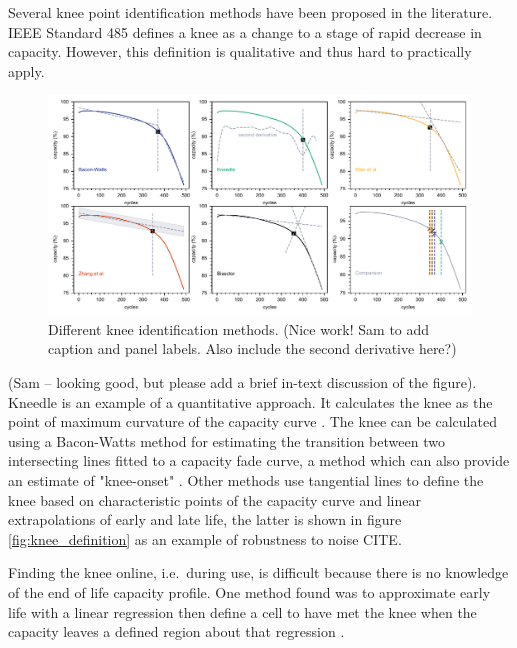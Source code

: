 \documentclass{article}
\begin{document}
Several knee point identification methods have been proposed in the literature. IEEE Standard 485  \cite{noauthor_ieee_2011} defines a knee as a change to a stage of rapid decrease in capacity. However, this definition is qualitative and thus hard to practically apply.

\begin{figure}[ht]
\centering
\includegraphics[width=\textwidth]{images/knee_identification_methods.pdf}
\caption{Different knee identification methods. (Nice work! Sam to add caption and panel labels. Also include the second derivative here?)}
\label{fig:knee_identification_methods}
\end{figure}


(Sam -- looking good, but please add a brief in-text discussion of the figure).
Kneedle is an example of a quantitative approach. It calculates the knee as the point of maximum curvature of the capacity curve \cite{satopaa_finding_2011}. The knee can be calculated using a Bacon-Watts method for estimating the transition between two intersecting lines fitted to a capacity fade curve, a method which can also provide an estimate of "knee-onset" \cite{fermin-cueto_identification_2020}. Other methods use tangential lines to define the knee based on characteristic points of the capacity curve \cite{diao_algorithm_2019} and linear extrapolations of early and late life, the latter is shown in figure \ref{fig:knee_definition} as an example of robustness to noise CITE.

Finding the knee online, i.e.\ during use, is difficult because there is no knowledge of the end of life capacity profile. One method found was to approximate early life with a linear regression then define a cell to have met the knee when the capacity leaves a defined region about that regression \cite{zhang_accelerated_2019}.
\end{document}
